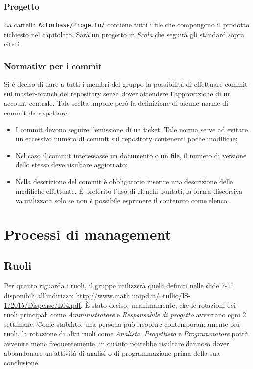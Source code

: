 \documentclass[a4paper]{report}
\begin{document}
	\subsubsection{Progetto}
	La cartella \verb|Actorbase/Progetto/| contiene tutti i file che compongono il prodotto richiesto nel capitolato. Sarà  un progetto in
	\emph{Scala} che seguirà gli standard sopra citati.
	\subsubsection{Normative per i commit}
		Si è deciso di dare a tutti i membri del gruppo la possibilità di effettuare commit sul master-branch del repository 
		senza dover attendere l'approvazione di un account centrale. Tale scelta impone però la definizione di alcune norme 
		di commit da rispettare:
		\begin{itemize}
			\item I commit devono seguire l'emissione di un ticket. Tale norma serve ad evitare un eccessivo numero di
			 commit sul repository contenenti poche modifiche;
			\item Nel caso il commit interessasse un documento o un file, il numero di versione dello stesso deve risultare
			 aggiornato;
			\item Nella descrizione del commit è obbligatorio inserire una descrizione delle modifiche effettuate. \'E preferito  
			l'uso di elenchi puntati, la forma discorsiva va utilizzata solo se non è possibile esprimere il contenuto come 
			elenco.
		\end{itemize}
	\section{Processi di management}
	\subsection{Ruoli}
		Per quanto riguarda i ruoli, il gruppo utilizzerà quelli definiti nelle slide 7-11 disponibili all'indirizzo: 
		\url{http://www.math.unipd.it/~tullio/IS-1/2015/Dispense/L04.pdf}. È stato deciso, unanimamente, che le rotazioni dei ruoli principali
		come \emph{Amministratore} e \emph{Responsabile di progetto} avverrano ogni 2 settimane. Come stabilito, una persona può ricoprire
		contemporaneamente più ruoli, la rotazione di altri ruoli come \emph{Analista}, \emph{Progettista} e \emph{Programmatore} potrà avvenire 
		meno frequentemente, in quanto potrebbe risultare dannoso dover abbandonare un'attività di analisi o di programmazione prima della sua 
		conclusione. 
		
\end{document}
